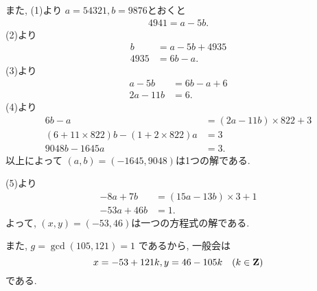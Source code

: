 \begin{enumerate}[6.1]
\begin{enumerate}[(a)]
  また, (1)より $a = 54321, b=9876$とおくと
  \begin{align*}
    4941 = a - 5b.
  \end{align*}
  (2)より
  \begin{align*}
    b &= a - 5b + 4935 \\
    4935 &= 6b - a.
  \end{align*}
  (3)より
  \begin{align*}
    a - 5b &= 6b - a + 6 \\
    2a - 11b &= 6.
  \end{align*}
  (4)より
  \begin{align*}
    6b - a &= (2a - 11b) \times 822 + 3 \\
    (6 + 11 \times 822)b - (1 + 2 \times 822)a &= 3 \\
    9048b - 1645a &= 3.
  \end{align*}
  以上によって $(a, b) = (-1645, 9048)$は1つの解である.

  (5)より
  \begin{align*}
    -8a + 7b &= (15a - 13b) \times 3 + 1 \\
    -53a + 46b &= 1.
  \end{align*}
  よって, $(x, y) = (-53, 46)$は一つの方程式の解である.

  また, $g = \gcd(105, 121) = 1$ であるから, 一般会は
  \[
    x = -53 + 121k,
    y =  46 - 105k \quad (k \in \mathbf{Z})
  \]
  である.
  \end{enumerate}
\end{enumerate} %

